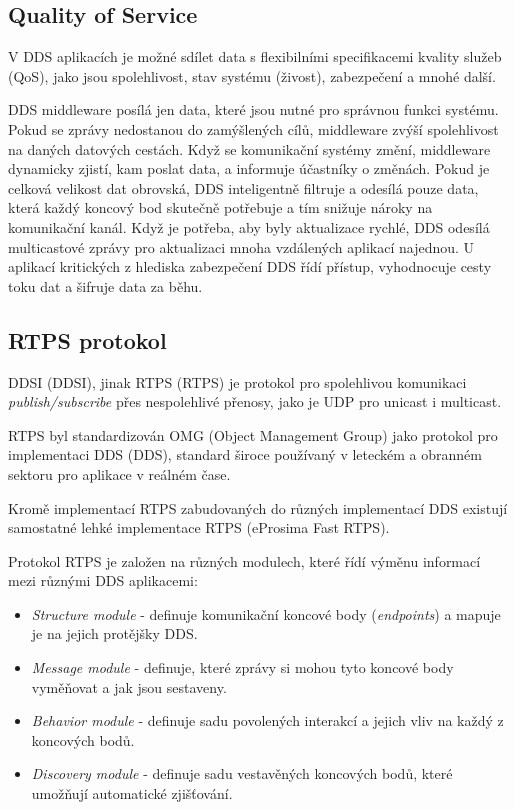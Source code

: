 \subsection{Quality of Service}

V \acs{DDS} aplikacích je možné sdílet data s flexibilními specifikacemi kvality služeb (\acs{QoS}), jako jsou spolehlivost, stav systému (živost), zabezpečení a mnohé další. 

\acs{DDS} middleware posílá jen data, které jsou nutné pro správnou funkci systému. Pokud se zprávy nedostanou do zamýšlených cílů, middleware zvýší spolehlivost na daných datových cestách. Když se komunikační systémy změní, middleware dynamicky zjistí, kam poslat data, a informuje účastníky o změnách. Pokud je celková velikost dat obrovská, \acs{DDS} inteligentně filtruje a odesílá pouze data, která každý koncový bod skutečně potřebuje a tím snižuje nároky na komunikační kanál. Když je potřeba, aby byly aktualizace rychlé, \acs{DDS} odesílá multicastové zprávy pro aktualizaci mnoha vzdálených aplikací najednou. U aplikací kritických z hlediska zabezpečení \acs{DDS} řídí přístup, vyhodnocuje cesty toku dat a šifruje data za běhu. \cite{DDS_Main}

\subsection{\acs{RTPS} protokol}

\acs{DDSI} (\acl{DDSI}), jinak \acs{RTPS} (\acl{RTPS}) je protokol pro spolehlivou komunikaci \textit{publish/subscribe} přes nespolehlivé přenosy, jako je UDP pro unicast i multicast. \cite{DDS_Standard}

\acs{RTPS} byl standardizován OMG (Object Management Group) jako protokol pro implementaci \acl{DDS} (\acs{DDS}), standard široce používaný v leteckém a obranném sektoru pro aplikace v reálném čase.

Kromě implementací \acs{RTPS} zabudovaných do různých implementací \acs{DDS} existují samostatné lehké implementace \acs{RTPS} (eProsima Fast \acs{RTPS}).

Protokol RTPS je založen na různých modulech, které řídí výměnu informací mezi různými \acs{DDS} aplikacemi: \cite{Eprosima}

\begin{itemize}
    \item \textit{Structure module} - definuje komunikační koncové body (\textit{endpoints}) a mapuje je na jejich protějšky \acs{DDS}.
    \item \textit{Message module} - definuje, které zprávy si mohou tyto koncové body vyměňovat a jak jsou sestaveny.
    \item \textit{Behavior module} - definuje sadu povolených interakcí a jejich vliv na každý z koncových bodů.
    \item \textit{Discovery module} - definuje sadu vestavěných koncových bodů, které umožňují automatické zjišťování.
\end{itemize}

